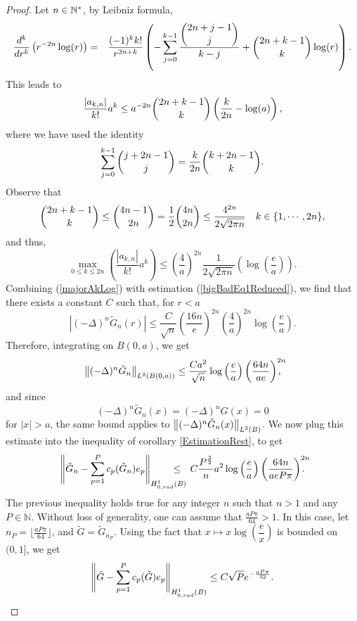\documentclass{article}
\begin{document}
\begin{proof}
	Let $n \in \mathbb{N}^*$, by Leibniz formula, 
	\begin{eqnarray*}						
		\dfrac{d^k }{dr^k}\left(r^{-2n}\log(r)\right) & = & \dfrac{(-1)^k k!}{r^{2n+k}}  \left(-\displaystyle\sum_{j=0}^{k-1}\dfrac{\dbinom{2n+j-1}{j}}{k-j}+\dbinom{2n+k-1}{k}\log(r)\right). \\
	\end{eqnarray*}
	This leads to \[\dfrac{|a_{k,n}|}{k!}a^k \leq a^{-2n} \dbinom{2n + k -1}{k}\left(\frac{k}{2n}-\log(a)\right),\]
	where we have used the identity
	\begin{equation*}
		\sum_{j=0}^{k-1}\dbinom{j+2n-1}{j} = \dfrac{k}{2n}\dbinom{k+2n-1}{k}.
	\end{equation*}
	Observe that
	\begin{equation*}
		\dbinom{2n+k-1}{k}\leq \dbinom{4n-1}{2n} = \frac{1}{2}\dbinom{4n}{2n} \leq \dfrac{4^{2n}}{2\sqrt{2\pi n}} \quad k \in \{1,\cdots,2n\},
	\end{equation*}
	and thus,
	\begin{equation}
		\max_{0\leq k \leq 2n}\left(\dfrac{|a_{k,n}|}{k!}a^k\right) \leq \left(\frac{4}{a}\right)^{2n}\dfrac{1}{2\sqrt{2\pi n}}\left(\log\left(\frac{e}{a}\right)\right).
		\label{majorAkLog} 
	\end{equation}							
	Combining (\ref{majorAkLog}) with estimation (\ref{bigBadEq1Reduced}), we find that there exists a constant $C$ such that, for $r<a$
	\[|(-\Delta)^n \tilde{G}_n (r)|\leq \dfrac{C}{\sqrt{n}}\left( \frac{16n}{e}\right)^{2n}\left(\frac{4}{a}\right)^{2n}\log\left(\dfrac{e}{a}\right).\]
	Therefore, integrating on $B(0,a)$, we get
	\[ \left\|(-\Delta)^n \tilde{G}_n\right\|_{L^2(B(0,a))} \leq \dfrac{C a^2}{\sqrt{n}}\log\left(\frac{e}{a}\right)\left( \frac{64n}{ae}\right)^{2n}\!\!\!\!\!\!,\]
	and since 
	\[(-\Delta)^n \tilde{G}_n(x) = (-\Delta)^n G(x) = 0\]
	for $|x|>a$, the same bound applies to $\left\|(-\Delta)^n \tilde{G}_n(x)\right\|_{L^2(B)}$. 
	We now plug this estimate into the inequality of corollary \ref{EstimationRest}, to get
	\[ \norm{\tilde{G}_n - \sum_{p=1}^{P}c_p(\tilde{G}_n)e_p}_{\Hzrad} \!\!\!\!\!\!\!\!\!\!\leq~~ C \dfrac{P^\frac{3}{2}}{n} a^2 \log\left(\dfrac{e}{a}\right)\left( \frac{64 n}{ae P \pi}\right)^{2n}\!\!\!\!\!\!.\] 
	The previous inequality holds true for any integer $n$ such that $n>1$ and any $P \in \mathbb{N}$. Without loss of generality, one can assume that $\frac{aP\pi}{64} >1$. In this case, let $n_P = \lfloor \frac{aP\pi}{64}\rfloor $, and $\tilde{G} = \tilde{G}_{n_P}$. Using the fact that $x\mapsto x \log\left(\dfrac{e}{x}\right)$ is bounded on $(0,1]$, we get 
	\[ \left\|\tilde{G} - \sum_{p=1}^{P}c_p(\tilde{G})e_p\right\|_{H^1_{0,rad}(B)} \leq C \sqrt{P} e^{-\frac{aP\pi}{32}}.\]
	
\end{proof}																												
\end{document}
